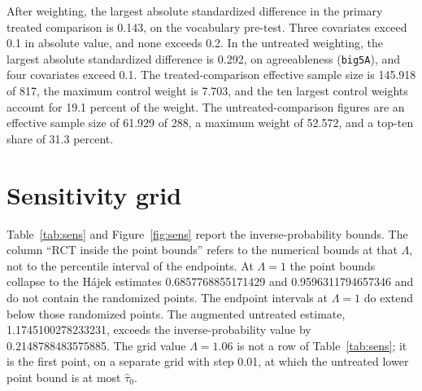 \documentclass[11pt]{article}
\begin{document}
After weighting, the largest absolute standardized difference in the primary treated comparison is 0.143, on the vocabulary pre-test. Three covariates exceed 0.1 in absolute value, and none exceeds 0.2. In the untreated weighting, the largest absolute standardized difference is 0.292, on agreeableness (\texttt{big5A}), and four covariates exceed 0.1. The treated-comparison effective sample size is 145.918 of 817, the maximum control weight is 7.703, and the ten largest control weights account for 19.1 percent of the weight. The untreated-comparison figures are an effective sample size of 61.929 of 288, a maximum weight of 52.572, and a top-ten share of 31.3 percent.

\section{Sensitivity grid}
\label{sec:sens}

Table~\ref{tab:sens} and Figure~\ref{fig:sens} report the inverse-probability bounds. The column ``RCT inside the point bounds'' refers to the numerical bounds at that $\Lambda$, not to the percentile interval of the endpoints. At $\Lambda=1$ the point bounds collapse to the H{\'a}jek estimates 0.6857768855171429 and 0.9596311794657346 and do not contain the randomized points. The endpoint intervals at $\Lambda=1$ do extend below those randomized points. The augmented untreated estimate, 1.1745100278233231, exceeds the inverse-probability value by 0.2148788483575885. The grid value $\Lambda=1.06$ is not a row of Table~\ref{tab:sens}; it is the first point, on a separate grid with step 0.01, at which the untreated lower point bound is at most $\widehat\tau_0$.
\end{document}
